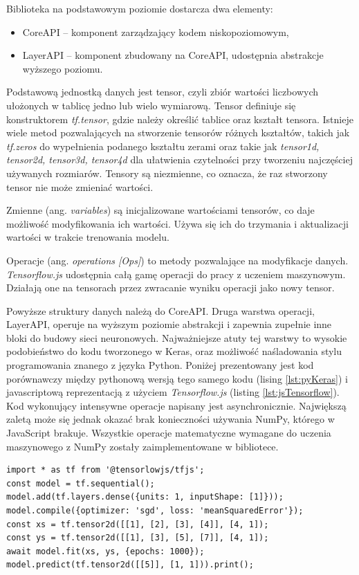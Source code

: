 \documentclass[12pt,a4paper,twoside,titlepage,openright]{book}
\begin{document}
\begin{itemize}
Biblioteka na podstawowym poziomie dostarcza dwa elementy:
\begin{itemize}
\item CoreAPI -- komponent zarządzający kodem niskopoziomowym,
\item LayerAPI -- komponent zbudowany na CoreAPI, udostępnia abstrakcje wyższego poziomu.
\end{itemize}

Podstawową jednostką danych jest tensor, czyli zbiór wartości liczbowych ułożonych w tablicę jedno lub wielo wymiarową. Tensor definiuje się konstruktorem \textit{tf.tensor}, gdzie należy określić tablice oraz kształt tensora. Istnieje wiele metod pozwalających na stworzenie tensorów różnych kształtów, takich jak \textit{tf.zeros} do wypełnienia podanego kształtu zerami oraz takie jak \textit{tensor1d, tensor2d, tensor3d, tensor4d} dla ułatwienia czytelności przy tworzeniu najczęściej używanych rozmiarów.
Tensory są niezmienne, co oznacza, że raz stworzony tensor nie może zmieniać wartości. 

Zmienne (ang. \textit{variables}) są inicjalizowane wartościami tensorów, co daje możliwość modyfikowania ich wartości. Używa się ich do trzymania i aktualizacji wartości w trakcie trenowania modelu.

Operacje (ang. \textit{operations [Ops]}) to metody pozwalające na modyfikacje danych. \textit{Tensorflow.js} udostępnia całą gamę operacji do pracy z uczeniem maszynowym. Działają one na tensorach przez zwracanie wyniku operacji jako nowy tensor.

Powyższe struktury danych należą do CoreAPI. Druga warstwa operacji, LayerAPI, operuje na wyższym poziomie abstrakcji i zapewnia zupełnie inne bloki do budowy sieci neuronowych. Najważniejsze atuty tej warstwy to wysokie podobieństwo do kodu tworzonego w Keras, oraz możliwość naśladowania stylu programowania znanego z języka Python. Poniżej prezentowany jest kod porównawczy między pythonową wersją tego samego kodu (lising \ref{lst:pyKeras}) i javascriptową reprezentacją z użyciem \textit{Tensorflow.js} (listing \ref{lst:jsTensorflow}). Kod wykonujący intensywne operacje napisany jest asynchronicznie. Największą zaletą może się jednak okazać brak konieczności używania NumPy, którego w JavaScript brakuje. Wszystkie operacje matematyczne wymagane do uczenia maszynowego z NumPy zostały zaimplementowane w bibliotece. \cite{siteTensorflowJSConcepts}

\noindent
\begin{minipage}{\linewidth}
\begin{lstlisting}[caption=Proste operacje w JavaScript z Tensorflow.js, label=lst:jsTensorflow]
import * as tf from '@tensorlowjs/tfjs';
const model = tf.sequential();
model.add(tf.layers.dense({units: 1, inputShape: [1]}));
model.compile({optimizer: 'sgd', loss: 'meanSquaredError'});
const xs = tf.tensor2d([[1], [2], [3], [4]], [4, 1]);
const ys = tf.tensor2d([[1], [3], [5], [7]], [4, 1]);
await model.fit(xs, ys, {epochs: 1000});
model.predict(tf.tensor2d([[5]], [1, 1])).print();
\end{lstlisting}
\end{minipage}


\end{itemize}
\end{document}
